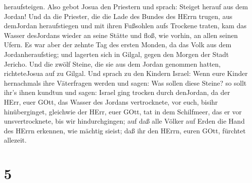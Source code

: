 heraufsteigen.  Also gebot Josua den Priestern und sprach:
Steiget herauf aus dem Jordan!  Und da die Priester, die
die Lade des Bundes des HErrn trugen, aus demJordan heraufstiegen und
mit ihren Fußsohlen aufs Trockene traten, kam das Wasser desJordans
wieder an seine Stätte und floß, wie vorhin, an allen seinen Ufern.
 Es war aber der zehnte Tag des ersten Monden, da das Volk
aus dem Jordanheraufstieg; und lagerten sich in Gilgal, gegen den Morgen
der Stadt Jericho.  Und die zwölf Steine, die sie aus dem
Jordan genommen hatten, richteteJosua auf zu Gilgal.  Und
sprach zu den Kindern Israel: Wenn eure Kinder hernachmals ihre
Väterfragen werden und sagen: Was sollen diese Steine?  so
sollt ihr's ihnen kundtun und sagen: Israel ging trocken durch
denJordan,  da der HErr, euer GOtt, das Wasser des Jordans
vertrocknete, vor euch, bisihr hinüberginget, gleichwie der HErr, euer
GOtt, tat in dem Schilfmeer, das er vor unsvertrocknete, bis wir
hindurchgingen;  auf daß alle Völker auf Erden die Hand des
HErrn erkennen, wie mächtig sieist; daß ihr den HErrn, euren GOtt,
fürchtet allezeit.

\hypertarget{section-4}{%
\section{5}\label{section-4}}

